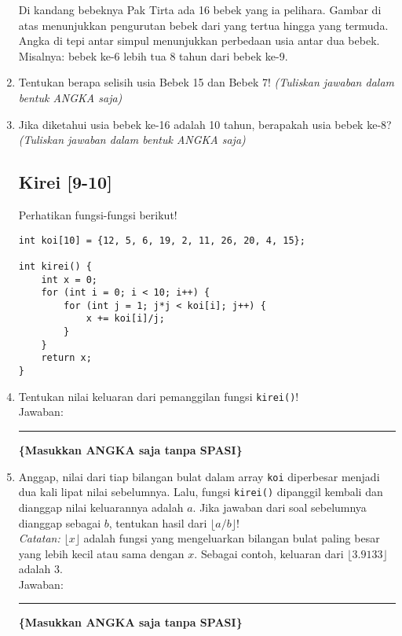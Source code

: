 \documentclass[a4paper,11pt]{article}
\begin{document}
\begin{enumerate}
Di kandang bebeknya Pak Tirta ada 16 bebek yang ia pelihara. Gambar di atas menunjukkan pengurutan bebek dari yang tertua hingga yang termuda. Angka di tepi antar simpul menunjukkan perbedaan usia antar dua bebek.  
Misalnya: bebek ke-6 lebih tua 8 tahun dari bebek ke-9.


    \item Tentukan berapa selisih usia Bebek 15 dan Bebek 7!  
    \textit{(Tuliskan jawaban dalam bentuk ANGKA saja)}

    \item Jika diketahui usia bebek ke-16 adalah 10 tahun, berapakah usia bebek ke-8?  
    \textit{(Tuliskan jawaban dalam bentuk ANGKA saja)}

\subsection*{Kirei [9-10]}

Perhatikan fungsi-fungsi berikut!

\begin{verbatim}
int koi[10] = {12, 5, 6, 19, 2, 11, 26, 20, 4, 15};

int kirei() {
    int x = 0;
    for (int i = 0; i < 10; i++) {
        for (int j = 1; j*j < koi[i]; j++) {
            x += koi[i]/j;
        }
    }
    return x;
}
\end{verbatim}
    
    \item Tentukan nilai keluaran dari pemanggilan fungsi \texttt{kirei()}! \\
    Jawaban: \rule{4cm}{0.4pt} \textbf{\{Masukkan ANGKA saja tanpa SPASI\}}

    \item Anggap, nilai dari tiap bilangan bulat dalam array \texttt{koi} diperbesar menjadi dua kali lipat nilai sebelumnya. Lalu, fungsi \texttt{kirei()} dipanggil kembali dan dianggap nilai keluarannya adalah $a$. Jika jawaban dari soal sebelumnya dianggap sebagai $b$, tentukan hasil dari $\lfloor a/b \rfloor$! \\

    \textit{Catatan:} $\lfloor x \rfloor$ adalah fungsi yang mengeluarkan bilangan bulat paling besar yang lebih kecil atau sama dengan $x$. Sebagai contoh, keluaran dari $\lfloor 3.9133 \rfloor$ adalah 3.\\
    Jawaban: \rule{4cm}{0.4pt} \textbf{\{Masukkan ANGKA saja tanpa SPASI\}}




\end{enumerate}
\end{document}
